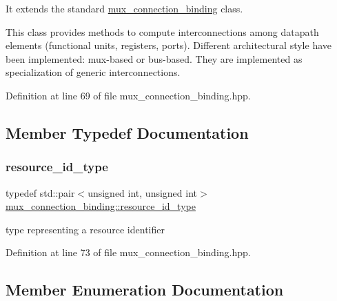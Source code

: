 It extends the standard \hyperlink{classmux__connection__binding}{mux\+\_\+connection\+\_\+binding} class.

This class provides methods to compute interconnections among datapath elements (functional units, registers, ports). Different architectural style have been implemented\+: mux-\/based or bus-\/based. They are implemented as specialization of generic interconnections. 

Definition at line 69 of file mux\+\_\+connection\+\_\+binding.\+hpp.



\subsection{Member Typedef Documentation}
\mbox{\label{classmux__connection__binding_aa43c7eaf66a55ac97a5a7f57f6149025}} 
\subsubsection{\texorpdfstring{resource\+\_\+id\+\_\+type}{resource\_id\_type}}
{\footnotesize\ttfamily typedef std\+::pair$<$unsigned int, unsigned int$>$ \hyperlink{classmux__connection__binding_aa43c7eaf66a55ac97a5a7f57f6149025}{mux\+\_\+connection\+\_\+binding\+::resource\+\_\+id\+\_\+type}\hspace{0.3cm}{\ttfamily [private]}}



type representing a resource identifier 



Definition at line 73 of file mux\+\_\+connection\+\_\+binding.\+hpp.



\subsection{Member Enumeration Documentation}
\mbox{\label{classmux__connection__binding_aaf8d69f505f7832b20e1b0c50c3b6efe}} 
